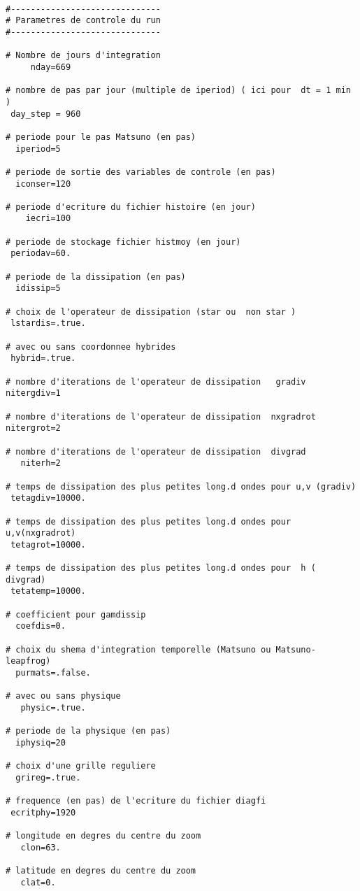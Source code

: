 {\footnotesize
\begin{verbatim}

#------------------------------
# Parametres de controle du run
#------------------------------

# Nombre de jours d'integration
     nday=669

# nombre de pas par jour (multiple de iperiod) ( ici pour  dt = 1 min )
 day_step = 960

# periode pour le pas Matsuno (en pas)
  iperiod=5

# periode de sortie des variables de controle (en pas)
  iconser=120

# periode d'ecriture du fichier histoire (en jour)
    iecri=100

# periode de stockage fichier histmoy (en jour)
 periodav=60.

# periode de la dissipation (en pas)
  idissip=5

# choix de l'operateur de dissipation (star ou  non star )
 lstardis=.true.

# avec ou sans coordonnee hybrides
 hybrid=.true.

# nombre d'iterations de l'operateur de dissipation   gradiv
nitergdiv=1

# nombre d'iterations de l'operateur de dissipation  nxgradrot
nitergrot=2

# nombre d'iterations de l'operateur de dissipation  divgrad
   niterh=2

# temps de dissipation des plus petites long.d ondes pour u,v (gradiv)
 tetagdiv=10000.

# temps de dissipation des plus petites long.d ondes pour u,v(nxgradrot)
 tetagrot=10000.

# temps de dissipation des plus petites long.d ondes pour  h ( divgrad)
 tetatemp=10000.

# coefficient pour gamdissip
  coefdis=0.

# choix du shema d'integration temporelle (Matsuno ou Matsuno-leapfrog)
  purmats=.false.

# avec ou sans physique
   physic=.true.

# periode de la physique (en pas)
  iphysiq=20

# choix d'une grille reguliere
  grireg=.true.

# frequence (en pas) de l'ecriture du fichier diagfi
 ecritphy=1920

# longitude en degres du centre du zoom
   clon=63.

# latitude en degres du centre du zoom
   clat=0.


\end{verbatim}}
